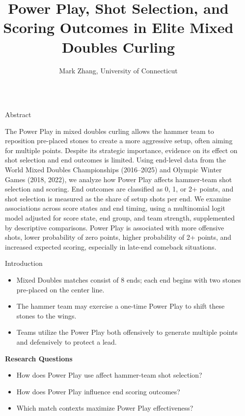 \documentclass[final]{beamer}
\title{Power Play, Shot Selection, and \\ Scoring Outcomes in Elite Mixed Doubles Curling}
\author{Mark Zhang, University of Connecticut}
\newlength{\sepwidth}
\newlength{\colwidth}
\newcommand{\separatorcolumn}{\begin{column}{\sepwidth}\end{column}}
\begin{document}
\begin{frame}[t]
  \begin{columns}[t]

    \separatorcolumn
    \begin{column}\colwidth
      \begin{block}{Abstract}

        The Power Play in mixed doubles curling allows the hammer team to reposition
        pre-placed stones to create a more aggressive setup, often aiming for multiple
        points. Despite its strategic importance, evidence on its effect on shot
        selection and end outcomes is limited. Using end-level data from the World
        Mixed Doubles Championships (2016–2025) and Olympic Winter Games (2018, 2022),
        we analyze how Power Play affects hammer-team shot selection and scoring. End
        outcomes are classified as 0, 1, or 2+ points, and shot selection is measured
        as the share of setup shots per end. We examine associations across score
        states and end timing, using a multinomial logit model adjusted for score
        state, end group, and team strength, supplemented by descriptive comparisons.
        Power Play is associated with more offensive shots, lower probability of zero
        points, higher probability of 2+ points, and increased expected scoring,
        especially in late-end comeback situations.
      \end{block}
      \begin{block}{Introduction}
        \begin{itemize}
          \item Mixed Doubles matches consist of 8 ends; each end begins with two stones
                pre-placed on the center line.
          \item The hammer team may exercise a one-time Power Play to shift these stones to the
                wings.
          \item Teams utilize the Power Play both offensively to generate multiple points and
                defensively to protect a lead.
        \end{itemize}
        \textbf{Research Questions}
        \begin{itemize}
          \item How does Power Play use affect hammer-team shot selection?
          \item How does Power Play influence end scoring outcomes?
          \item Which match contexts maximize Power Play effectiveness?


\end{itemize}
\end{block}
\end{column}
\end{columns}
\end{frame}
\end{document}
